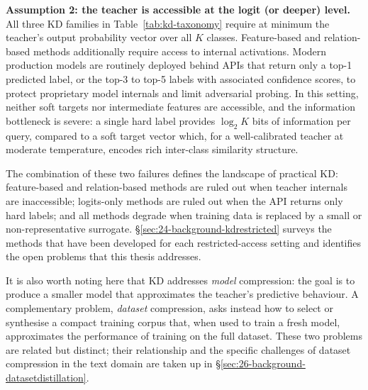 \begin{foldable}
  \textbf{Assumption 2: the teacher is accessible at the logit (or deeper) level.}
  All three KD families in Table~\ref{tab:kd-taxonomy} require at minimum the teacher's output probability vector over all $K$ classes.
  Feature-based and relation-based methods additionally require access to internal activations.
  Modern production models are routinely deployed behind APIs that return only a top-1 predicted label, or the top-3 to top-5 labels with associated confidence scores, to protect proprietary model internals and limit adversarial probing.
  In this setting, neither soft targets nor intermediate features are accessible, and the information bottleneck is severe: a single hard label provides $\log_2 K$ bits of information per query, compared to a soft target vector which, for a well-calibrated teacher at moderate temperature, encodes rich inter-class similarity structure.
\end{foldable}

\begin{foldable}
  The combination of these two failures defines the landscape of practical KD: feature-based and relation-based methods are ruled out when teacher internals are inaccessible;
  logits-only methods are ruled out when the API returns only hard labels; and all methods degrade when training data is replaced by a small or non-representative surrogate.
  \S\ref{sec:24-background-kdrestricted} surveys the methods that have been developed for each restricted-access setting and identifies the open problems that this thesis addresses.
\end{foldable}

\begin{foldable}
  It is also worth noting here that KD addresses \emph{model} compression: the goal is to produce a smaller model that approximates the teacher's predictive behaviour.
  A complementary problem, \emph{dataset} compression, asks instead how to select or synthesise a compact training corpus that, when used to train a fresh model, approximates the performance of training on the full dataset.
  These two problems are related but distinct; their relationship and the specific challenges of dataset compression in the text domain are taken up in \S\ref{sec:26-background-datasetdistillation}.
\end{foldable}
